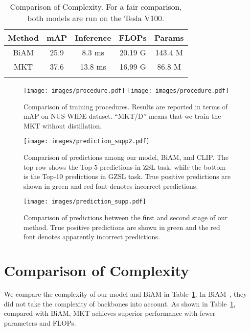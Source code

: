 \documentclass[letterpaper]{article} \usepackage{aaai23}  \usepackage{times}  \usepackage{helvet}  \usepackage{courier}  \usepackage[hyphens]{url}  \usepackage{graphicx} \urlstyle{rm} \def\UrlFont{\rm}  \usepackage{natbib}  \usepackage{caption} \frenchspacing  \setlength{\pdfpagewidth}{8.5in}  \setlength{\pdfpageheight}{11in}
\begin{document}
\begin{table}[t]
\caption{Comparison of Complexity. For a fair comparison, both models are run on the Tesla V100.}
\centering
\footnotesize
\begin{tabular}{ccccc}
\toprule[0.15em]
\textbf{Method} & \textbf{mAP} & \textbf{Inference} & \textbf{FLOPs} & \textbf{Params} \\
\hline
BiAM & 25.9 & 8.3 ms  & 20.19 G & 143.4 M \\
MKT & 37.6 & 13.8 ms & 16.99 G & 86.8 M \\
\toprule[0.15em]
\label{tab:complex}
\end{tabular}
\end{table} \begin{figure}[t]
  \centering
    {\texttt{[image: images/procedure.pdf]}}
    {\texttt{[image: images/procedure.pdf]}}
  \caption{Comparison of training procedures. Results are reported in terms of mAP on NUS-WIDE dataset. ``MKT/D'' means that we train the MKT without distillation. 
  }
  \label{fig:dis}
\end{figure} 
\begin{figure*}[ht]
    \centering
    \texttt{[image: images/prediction\_supp2.pdf]}
\caption{
Comparison of predictions among our model, BiAM, and CLIP. 
The top row shows the Top-5 predictions in ZSL task, while the bottom is the Top-10 predictions in GZSL task. 
True positive predictions are shown in green and red font denotes incorrect predictions. 
}
    \label{fig:prediction_supp2}
\end{figure*} 
\begin{figure}[ht]
\centering
\texttt{[image: images/prediction\_supp.pdf]}
\caption{
Comparison of predictions between the first and second stage of our method.
True positive predictions are shown in green and the red font denotes apparently incorrect predictions. }
\label{fig:prediction_supp}
\end{figure} 



\section{Comparison of Complexity}
\label{section:Comparison of Complexity}
We compare the complexity of our model and BiAM in Table~\ref{tab:complex}.
In BiAM~\cite{biam}, they did not take the complexity of backbones into account.
As shown in Table~\ref{tab:complex}, compared with BiAM, MKT achieves superior performance with fewer parameters and FLOPs.
\end{document}

